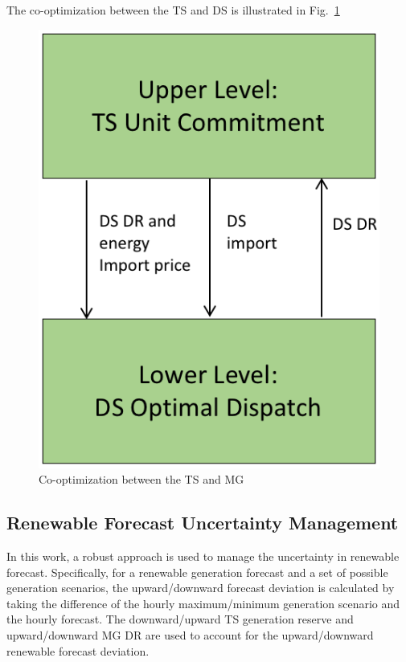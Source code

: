 The co-optimization between the TS and DS is illustrated in Fig.~\ref{wees}
\begin{figure}
\centering
\includegraphics[scale=0.3]{flows.png}
\caption{Co-optimization between the TS and MG}
\label{wees}
\end{figure}

\subsection{Renewable Forecast Uncertainty Management}
In this work, a robust approach is used to manage the uncertainty in renewable forecast. Specifically, for a renewable generation forecast and a set of possible generation scenarios, the upward/downward forecast deviation is calculated by taking the difference of the hourly maximum/minimum generation scenario and the hourly forecast. The downward/upward TS generation reserve and upward/downward MG DR are used to account for the upward/downward renewable forecast deviation.

